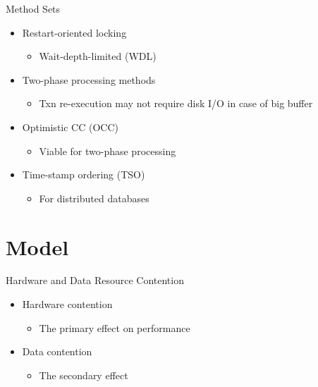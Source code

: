 \documentclass[sans]{beamer}
\begin{document}
\begin{frame}{Method Sets}
  \begin{itemize}
    \item Restart-oriented locking
    \begin{itemize}
      \item Wait-depth-limited (WDL)
    \end{itemize}

    \item Two-phase processing methods
    \begin{itemize}
      \item Txn re-execution may not require disk I/O
            in case of big buffer
    \end{itemize}
    \item Optimistic CC (OCC)
    \begin{itemize}
      \item Viable for two-phase processing
    \end{itemize}
    \item Time-stamp ordering (TSO)
    \begin{itemize}
      \item For distributed databases
    \end{itemize}
  \end{itemize}
\end{frame}

\section{Model}

\begin{frame}{Hardware and Data Resource Contention}
  \begin{itemize}
    \item Hardware contention
    \begin{itemize}
      \item The primary effect on performance
    \end{itemize}
    \item Data contention
    \begin{itemize}
      \item The secondary effect
    \end{itemize}
  \end{itemize}
\end{frame}
\end{document}
